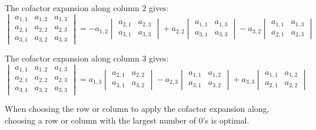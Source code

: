 \documentclass{article}
\begin{document}
The cofactor expansion along column \(2\) gives:
\[\begin{vmatrix}
a_{1,1} & a_{1,2} & a_{1,3} \\ 
a_{2,1} & a_{2,2} & a_{2,3} \\ 
a_{3,1} & a_{3,2} & a_{3,3} 
\end{vmatrix} = -a_{1,2}\begin{vmatrix}
a_{2,1} & a_{2,3} \\ 
a_{3,1} & a_{3,3} 
\end{vmatrix} + a_{2,2}\begin{vmatrix}
a_{1,1} & a_{1,3} \\ 
a_{3,1} & a_{3,3} 
\end{vmatrix} - a_{3,2}\begin{vmatrix}
a_{1,1} & a_{1,3} \\ 
a_{2,1} & a_{2,3}  
\end{vmatrix}\]

The cofactor expansion along column \(3\) gives:
\[\begin{vmatrix}
a_{1,1} & a_{1,2} & a_{1,3} \\ 
a_{2,1} & a_{2,2} & a_{2,3} \\ 
a_{3,1} & a_{3,2} & a_{3,3} 
\end{vmatrix} = a_{1,3}\begin{vmatrix}
a_{2,1} & a_{2,2} \\ 
a_{3,1} & a_{3,2} 
\end{vmatrix} - a_{2,3}\begin{vmatrix}
a_{1,1} & a_{1,2} \\ 
a_{3,1} & a_{3,2} 
\end{vmatrix} + a_{3,3}\begin{vmatrix}
a_{1,1} & a_{1,2} \\ 
a_{2,1} & a_{2,2}  
\end{vmatrix}\]



When choosing the row or column to apply the cofactor expansion along, choosing a row or column with the largest number of \(0\)'s is optimal.
\end{document}
